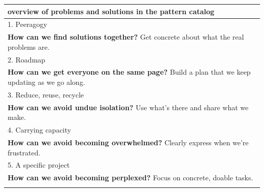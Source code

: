 \begin{longtable}[]{@{}l@{}}
\toprule
\begin{minipage}[b]{0.97\columnwidth}\raggedright
overview of problems and solutions in the pattern catalog\strut
\end{minipage}\tabularnewline
\midrule
\endhead
\begin{minipage}[t]{0.97\columnwidth}\raggedright
1. {{Peeragogy}}\strut
\end{minipage}\tabularnewline
\begin{minipage}[t]{0.97\columnwidth}\raggedright
\textbf{How can we find solutions together?} Get concrete about what the
real problems are.\strut
\end{minipage}\tabularnewline
\begin{minipage}[t]{0.97\columnwidth}\raggedright
2. {{Roadmap}}\strut
\end{minipage}\tabularnewline
\begin{minipage}[t]{0.97\columnwidth}\raggedright
\textbf{How can we get everyone on the same page?} Build a plan that we
keep updating as we go along.\strut
\end{minipage}\tabularnewline
\begin{minipage}[t]{0.97\columnwidth}\raggedright
3. {{Reduce, reuse, recycle}}\strut
\end{minipage}\tabularnewline
\begin{minipage}[t]{0.97\columnwidth}\raggedright
\textbf{How can we avoid undue isolation?} Use what's there and share
what we make.\strut
\end{minipage}\tabularnewline
\begin{minipage}[t]{0.97\columnwidth}\raggedright
4. {{Carrying capacity}}\strut
\end{minipage}\tabularnewline
\begin{minipage}[t]{0.97\columnwidth}\raggedright
\textbf{How can we avoid becoming overwhelmed?} Clearly express when
we're frustrated.\strut
\end{minipage}\tabularnewline
\begin{minipage}[t]{0.97\columnwidth}\raggedright
5. {{A specific project}}\strut
\end{minipage}\tabularnewline
\begin{minipage}[t]{0.97\columnwidth}\raggedright
\textbf{How can we avoid becoming perplexed?} Focus on concrete, doable
tasks.\strut
\end{minipage}\tabularnewline
\begin{minipage}[t]{0.97\columnwidth}\raggedright

\end{minipage}
\end{longtable}
